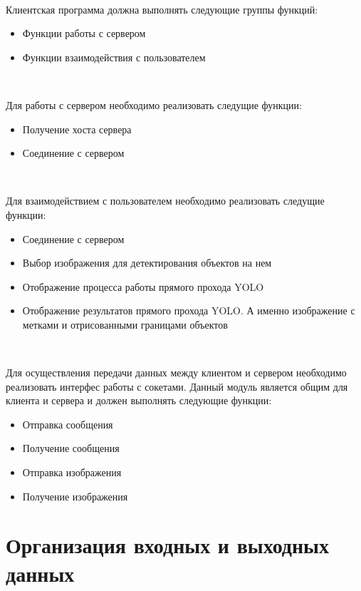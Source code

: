 \documentclass[a4paper,english]{G2-105}
\begin{document}
~\ 
\par Клиентская программа должна выполнять следующие группы функций:
\begin{itemize}
\item Функции работы с сервером
\item Функции взаимодействия с пользователем
\end{itemize}
~\ 
\par Для работы с сервером необходимо реализовать следущие функции:
\begin{itemize}
\item Получение хоста сервера
\item Соединение с сервером
\end{itemize}
~\ 
\par Для взаимодействием с пользователем необходимо реализовать следущие функции:
\begin{itemize}
\item Соединение с сервером
\item Выбор изображения для детектирования объектов на нем
\item Отображение процесса работы прямого прохода YOLO
\item Отображение результатов прямого прохода YOLO. А именно изображение с метками и отрисованными границами объектов
\end{itemize}
~\ 
\par Для осуществления передачи данных между клиентом и сервером необходимо реализовать интерфес работы с сокетами. Данный модуль является общим для клиента и сервера и должен выполнять следующие функции:
\begin{itemize}
\item Отправка сообщения
\item Получение сообщения
\item Отправка изображения
\item Получение изображения
\end{itemize} 

\section{Организация входных и выходных данных}
\end{document}
